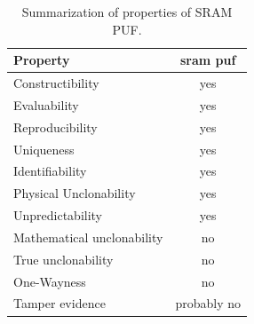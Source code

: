 \begin{table}[ht!]
\centering
\begin{tabular}{l c} 
    \textbf{Property} & \textbf{\gls{sram} \gls{puf}} \\
     \toprule
    Constructibility & yes\\ 
    Evaluability & yes\\
    Reproducibility & yes\\
    Uniqueness & yes\\
    Identifiability & yes\\ 
    Physical Unclonability & yes\\
    Unpredictability & yes\\
    Mathematical unclonability & no\\
    True unclonability & no\\
    One-Wayness & no\\
    Tamper evidence & probably no\\
     \bottomrule
    \end{tabular}
    \captionsetup{justification=centering,margin=0.5cm}
    \caption{Summarization of properties of SRAM PUF.}
    \label{table:sram_puf_properties}
\end{table}


